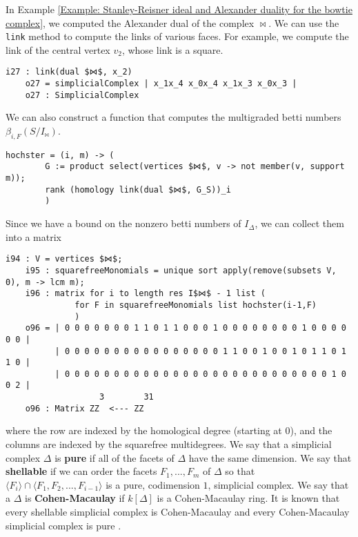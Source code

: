 \documentclass[12pt,leqno]{amsart}
\theoremstyle{definition}
\newenvironment{example}
{\pushQED{\qed}\renewcommand{\qedsymbol}{$\diamond$}\examplex}
{\popQED\endexamplex}
\begin{document}
\begin{example}
  In Example \ref{Example: Stanley-Reisner ideal and Alexander duality for the bowtie complex}, we computed the Alexander dual of the complex $\bowtie$. We can use the \texttt{link} method to compute the links of various faces. For example, we compute the link of the central vertex $v_2$, whose link is a square.
\begin{lstlisting}[basicstyle={\ttfamily \scriptsize}, xleftmargin=-23pt]
    i27 : link(dual $⋈$, x_2)
    o27 = simplicialComplex | x_1x_4 x_0x_4 x_1x_3 x_0x_3 |
    o27 : SimplicialComplex
\end{lstlisting}
  We can also construct a function that computes the multigraded betti numbers $\beta_{i,F}(S/I_{\bowtie})$.
\begin{lstlisting}[basicstyle={\ttfamily \scriptsize}, xleftmargin=-23pt]
    hochster = (i, m) -> (
        G := product select(vertices $⋈$, v -> not member(v, support m));
        rank (homology link(dual $⋈$, G_S))_i
        )
\end{lstlisting}
  Since we have a bound on the nonzero betti numbers of $I_\Delta$, we can collect them into a matrix
\begin{lstlisting}[basicstyle={\ttfamily \scriptsize}, xleftmargin=-23pt]
    i94 : V = vertices $⋈$;
    i95 : squarefreeMonomials = unique sort apply(remove(subsets V, 0), m -> lcm m);
    i96 : matrix for i to length res I$⋈$ - 1 list (
              for F in squarefreeMonomials list hochster(i-1,F)
              )
    o96 = | 0 0 0 0 0 0 0 1 1 0 1 1 0 0 0 1 0 0 0 0 0 0 0 0 1 0 0 0 0 0 0 |
          | 0 0 0 0 0 0 0 0 0 0 0 0 0 0 0 0 1 1 0 0 1 0 0 1 0 1 1 0 1 1 0 |
          | 0 0 0 0 0 0 0 0 0 0 0 0 0 0 0 0 0 0 0 0 0 0 0 0 0 0 0 1 0 0 2 |
                   3        31
    o96 : Matrix ZZ  <--- ZZ
\end{lstlisting}
  where the row are indexed by the homological degree (starting at $0$), and the columns are indexed by the squarefree multidegrees.
\end{example}
% 
We say that a simplicial complex $\Delta$ is \textbf{pure} if all of the facets of $\Delta$ have the same dimension. We say that \textbf{shellable} if we can order the facets $F_1,...,F_m$ of $\Delta$ so that $\langle F_i \rangle \cap \langle F_1,F_2,...,F_{i-1} \rangle$ is a pure, codimension $1$, simplicial complex. We say that a $\Delta$ is \textbf{Cohen-Macaulay} if $k[\Delta]$ is a Cohen-Macaulay ring. It is known that every shellable simplicial complex is Cohen-Macaulay \cite[Theorem 5.1.13]{BH} and every Cohen-Macaulay simplicial complex is pure \cite[Corollary 5.1.5]{BH}.
\end{document}

